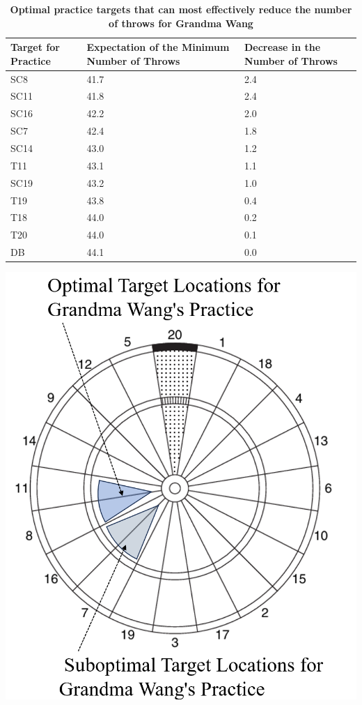\documentclass[cjjs]{ipart}
\theoremstyle{plain}
\begin{document}
\begin{table}[H]
\centering
\begin{minipage}{0.6\textwidth} 
    \begin{tabular}{|p{1cm}|p{2cm}|p{2cm}|} 
    \hline
    \textbf{Target for Practice} & \textbf{Expectation of the Minimum Number of Throws} & \textbf{Decrease in the Number of Throws} \\
    \hline
        SC8  & 41.7 & 2.4 \\
        SC11 & 41.8 & 2.4 \\
        SC16 & 42.2 & 2.0 \\
        SC7  & 42.4 & 1.8 \\
        SC14 & 43.0 & 1.2 \\
        T11  & 43.1 & 1.1 \\
        SC19 & 43.2 & 1.0 \\
        T19  & 43.8 & 0.4 \\
        T18  & 44.0 & 0.2 \\
        T20  & 44.0 & 0.1 \\
        DB   & 44.1 & 0.0 \\
    \hline
    \end{tabular}
    \caption{\textbf{Optimal practice targets that can most effectively reduce the number of throws for Grandma Wang}}
\end{minipage}
\hspace{1cm} 
\begin{minipage}{0.3\textwidth} 
    \centering
    \includegraphics[width=\textwidth]{example.png} 
\end{minipage}
\end{table}
\end{document}
